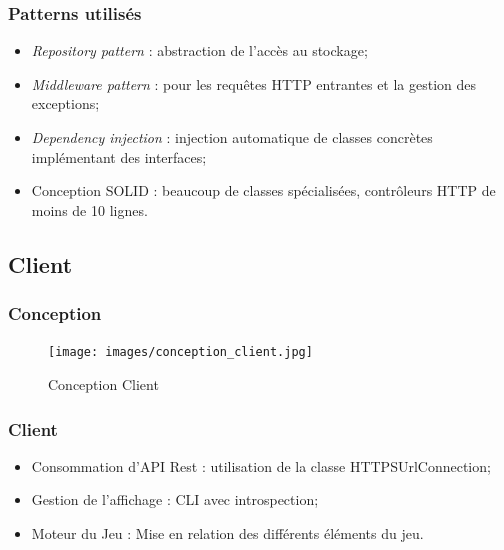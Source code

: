 	\begin{frame}
		\frametitle{Patterns utilisés}
		\begin{itemize}
			\item \textit{Repository pattern} : abstraction de l'accès au stockage;
			\item \textit{Middleware pattern} : pour les requêtes HTTP entrantes et la gestion des exceptions;
			\item \textit{Dependency injection} : injection automatique de classes concrètes implémentant des interfaces;
			\item Conception SOLID : beaucoup de classes spécialisées, contrôleurs HTTP de moins de 10 lignes.
		\end{itemize}
	\end{frame}

\subsection{Client}
	\begin{frame}
		\frametitle{Conception}
		\begin{figure}[H]
			\centering
			\texttt{[image: images/conception\_client.jpg]}
			\caption{Conception Client}
		\end{figure}
	\end{frame}
	\begin{frame}
		\frametitle{Client}
		\begin{itemize}
			\item Consommation d'API Rest : utilisation de la classe HTTPSUrlConnection;
			\item Gestion de l'affichage : CLI avec introspection;
			\item Moteur du Jeu : Mise en relation des différents éléments du jeu.
		\end{itemize}
	\end{frame}
